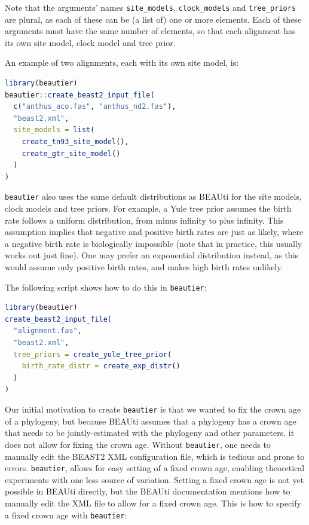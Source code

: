 \documentclass{article}
\begin{document}
Note that the arguments' names \verb;site_models;, \verb;clock_models; and \verb;tree_priors; are plural, as each of these
can be (a list of) one or more elements. Each of these arguments must have the same number of elements, so that each alignment has its
own site model, clock model and tree prior. 

An example of two alignments, each with its own site model, is:

\begin{lstlisting}[language=R, caption=Two alignments, label=lst:two_alignments, floatplacement=H]
library(beautier)
beautier::create_beast2_input_file(
  c("anthus_aco.fas", "anthus_nd2.fas"),
  "beast2.xml",
  site_models = list(
    create_tn93_site_model(), 
    create_gtr_site_model()
  )
)
\end{lstlisting}

\verb;beautier; also uses the same default distributions as BEAUti 
for the site models, clock models and tree priors. 
For example, a Yule tree prior assumes the birth rate follows a uniform distribution, 
from minus infinity to plus infinity. 
This assumption implies that negative and positive birth rates are just as likely, 
where a negative birth rate is biologically impossible (note that 
in practice, this usually works out just fine).
One may prefer an exponential distribution instead, 
as this would assume only positive birth rates, 
and makes high birth rates unlikely.

The following script shows how to do this in \verb;beautier;:

\begin{lstlisting}[language=R, caption=Example with Yule tree prior with different birth rate distribution, label=lst:diff_distr, floatplacement=H]
library(beautier)
create_beast2_input_file(
  "alignment.fas",
  "beast2.xml",
  tree_priors = create_yule_tree_prior(
    birth_rate_distr = create_exp_distr()    
  )
)
\end{lstlisting}

Our initial motivation to create \verb;beautier; 
is that we wanted to fix the crown age of a phylogeny, but because 
BEAUti assumes that a phylogeny has a crown age that needs to be jointly-estimated
with the phylogeny and other parameters. it does not allow for fixing
the crown age. Without \verb;beautier;, one needs to manually edit the BEAST2 
XML configuration file, which is tedious and prone to errors. 
\verb;beautier;, allows for easy setting of a fixed crown age, 
enabling theoretical experiments with one less source of variation. 
Setting a fixed crown age is not yet possible in BEAUti directly, 
but the BEAUti documentation mentions how to 
manually edit the XML file to allow for a fixed crown age. 
This is how to specify a fixed crown age with \verb;beautier;:
\end{document}

